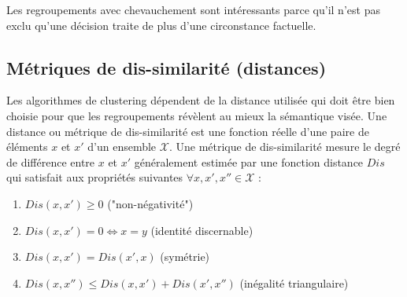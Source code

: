  Les regroupements avec chevauchement sont intéressants parce qu'il n'est pas exclu qu'une décision traite de plus d'une circonstance factuelle.



\subsection{Métriques de dis-similarité (distances)}
\label{sec:similarite:distances}
Les algorithmes de clustering dépendent de la distance utilisée qui doit être bien choisie pour que les regroupements révèlent au mieux la sémantique visée. Une distance ou métrique de dis-similarité est une fonction réelle d'une paire de éléments $x$ et $x'$ d'un ensemble $\mathcal{X}$. Une métrique de dis-similarité mesure le degré de différence entre $x$ et $x'$  généralement estimée par une fonction distance $Dis$  qui satisfait aux propriétés suivantes $\forall x,x',x'' \in \mathcal{X}$ \citep{wang2015distancemetriclearningsurvey}:
\begin{enumerate}
\item $Dis(x,x') \geq 0$ ("non-négativité")
\item $Dis(x,x') = 0  \Leftrightarrow x = y$ (identité discernable)
\item $Dis(x,x') = Dis(x', x)$ (symétrie)
\item $Dis(x,x'') \leq Dis(x,x') + Dis(x',x'')$ (inégalité triangulaire) \label{enum:sim:ineq-tri}
\end{enumerate}


